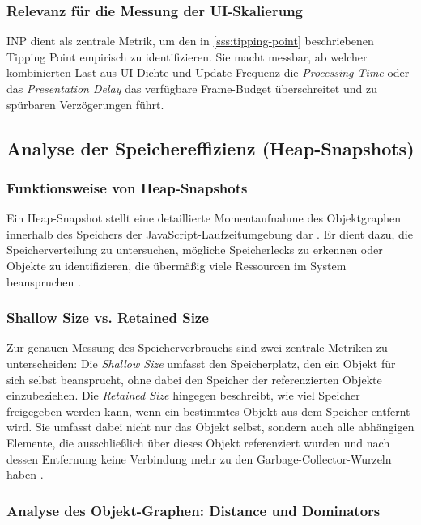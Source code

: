 \subsubsection{Relevanz für die Messung der UI-Skalierung}
INP dient als zentrale Metrik, um den in \cref{sss:tipping-point} beschriebenen Tipping Point empirisch zu identifizieren. Sie macht messbar, ab welcher kombinierten Last aus UI-Dichte und Update-Frequenz die \textit{Processing Time} oder das \textit{Presentation Delay} das verfügbare Frame-Budget überschreitet und zu spürbaren Verzögerungen führt.


\subsection{Analyse der Speichereffizienz (Heap-Snapshots)}
\label{ss:memory-efficiency}

\subsubsection{Funktionsweise von Heap-Snapshots}
Ein Heap-Snapshot stellt eine detaillierte Momentaufnahme des Objektgraphen innerhalb des Speichers der JavaScript-Laufzeitumgebung dar \cite{chrome-memory-terminology-2024}. Er dient dazu, die Speicherverteilung zu untersuchen, mögliche Speicherlecks zu erkennen oder Objekte zu identifizieren, die übermäßig viele Ressourcen im System beanspruchen \cite{chrome-heap-snapshots-2024}.

\subsubsection{Shallow Size vs. Retained Size}
Zur genauen Messung des Speicherverbrauchs sind zwei zentrale Metriken zu unterscheiden: Die \textit{Shallow Size} umfasst den Speicherplatz, den ein Objekt für sich selbst beansprucht, ohne dabei den Speicher der referenzierten Objekte einzubeziehen.
Die \textit{Retained Size} hingegen beschreibt, wie viel Speicher freigegeben werden kann, wenn ein bestimmtes Objekt aus dem Speicher entfernt wird. Sie umfasst dabei nicht nur das Objekt selbst, sondern auch alle abhängigen Elemente, die ausschließlich über dieses Objekt referenziert wurden und nach dessen Entfernung keine Verbindung mehr zu den Garbage-Collector-Wurzeln haben \cite{chrome-memory-terminology-2024}.

\subsubsection{Analyse des Objekt-Graphen: Distance und Dominators}

